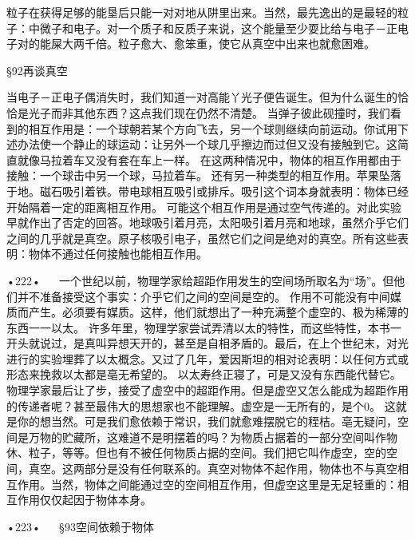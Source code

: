 粒子在获得足够的能垦后只能一对对地从阱里出来。当然，最先逸出的是最轻的粒子：中微子和电子。对一个质子和反质子来说，这个能量至少耍比给与电子－正电子对的能屎大两千倍。粒子愈大、愈笨重，使它从真空中出来也就愈困难。

§92再谈真空

当电子－正电子偶消失时，我们知道一对高能丫光子便告诞生。但为什么诞生的恰恰是光子而非其他东西？这点我们现在仍然不清楚。
当弹子彼此砚撞时，我们看到的相互作用是：一个球朝若某个方向飞去，另一个球则继续向前运动。你试用下述办法使一个静止的球运动：让另外一个球几乎擦边而过但又没有接触到它。这简直就像马拉着车又没有套在车上一样。
在这两种情况中，物体的相互作用都由于接触：一个球击中另一个球，马拉着车。
还有另一种类型的相互作用。苹果坠落于地。磁石吸引着铁。带电球相互吸引或排斥。吸引这个词本身就表明：物体已经开始隔着一定的距离相互作用。
可能这个相互作用是通过空气传递的。对此实验早就作出了否定的回答。地球吸引着月亮，太阳吸引着月亮和地球，虽然介乎它们之间的几乎就是真空。原子核吸引电子，虽然它们之间是绝对的真空。所有这些表明：物体不通过任何接触也能相互作用。

•222•
  
一个世纪以前，物理学家给超距作用发生的空间场所取名为“场”。但他们并不准备接受这个事实：介乎它们之间的空间是空的。
作用不可能没有中间媒质而产生。必须要有媒质。这样，他们就想出了一种充满整个虚空的、极为稀薄的东西一一以太。
许多年里，物理学家尝试弄清以太的特性，而这些特性，本书一开头就说过，是真叫异想天开的，甚至是自相矛盾的。最后，在上个世纪末，对光进行的实验埋葬了以太概念。又过了几年，爱因斯坦的相对论表明：以任何方式或形态来挽救以太都是亳无希望的。
以太寿终正寝了，可是又没有东西能代替它。物理学家最后让了步，接受了虚空中的超距作用。但是虚空又怎么能成为超距作用的传递者呢？甚至最伟大的思想家也不能理解。虚空是一无所有的，是个0。
这就是你的想当然。可是我们愈依赖于常识，我们就愈难摆脱它的秷桔。亳无疑问，空间是万物的贮藏所，这难道不是明摆着的吗？为物质占据着的一部分空间叫作物休、粒子，等等。但也有不被任何物质占据的空间。我们把它叫作虚空，空的空间，真空。这两部分是没有任何联系的。真空对物体不起作用，物体也不与真空相互作用。当然，物体之间能通过空的空间相互作用，但虚空这里是无足轻重的：相互作用仅仅起因于物体本身。

•223•
  
§93空间依赖于物体

